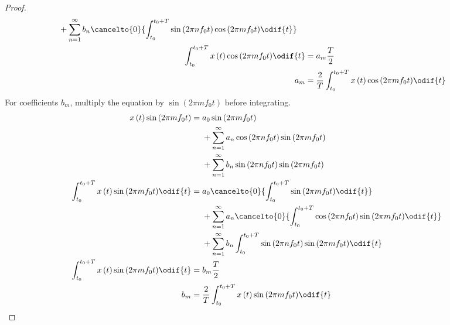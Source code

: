 \documentclass{article}
\begin{document}
\begin{proof}
\begin{align*}
\begin{aligned}[t]
             & + \sum_{n = 1}^\infty b_n \cancelto{0}{\int_{t_0}^{t_0 + T} \sin{\left( 2 \pi n f_0 t \right)} \cos{\left( 2 \pi m f_0 t \right)} \odif{t}}
        \end{aligned}
        \\
        \int_{t_0}^{t_0 + T} x\left( t \right) \cos{\left( 2 \pi m f_0 t \right)} \odif{t} & = a_m \frac{T}{2}                                                                                \\
        a_m                                                                                & = \frac{2}{T} \int_{t_0}^{t_0 + T} x\left( t \right) \cos{\left( 2 \pi m f_0 t \right)} \odif{t}
    \end{align*}
    For coefficients \(b_m\), multiply the equation by \(\sin{\left( 2
    \pi m f_0 t \right)}\) before integrating.
    \begin{align*}
        x\left( t \right) \sin{\left( 2 \pi m f_0 t \right)}                               & =
        \begin{aligned}[t]
             & a_0 \sin{\left( 2 \pi m f_0 t \right)}                                                          \\
             & + \sum_{n = 1}^\infty a_n \cos{\left( 2 \pi n f_0 t \right)} \sin{\left( 2 \pi m f_0 t \right)} \\
             & + \sum_{n = 1}^\infty b_n \sin{\left( 2 \pi n f_0 t \right)} \sin{\left( 2 \pi m f_0 t \right)}
        \end{aligned}
        \\
        \int_{t_0}^{t_0 + T} x\left( t \right) \sin{\left( 2 \pi m f_0 t \right)} \odif{t} & =
        \begin{aligned}[t]
             & a_0 \cancelto{0}{\int_{t_0}^{t_0 + T} \sin{\left( 2 \pi m f_0 t \right)} \odif{t}}                                                          \\
             & + \sum_{n = 1}^\infty a_n \cancelto{0}{\int_{t_0}^{t_0 + T} \cos{\left( 2 \pi n f_0 t \right)} \sin{\left( 2 \pi m f_0 t \right)} \odif{t}} \\
             & + \sum_{n = 1}^\infty b_n \int_{t_0}^{t_0 + T} \sin{\left( 2 \pi n f_0 t \right)} \sin{\left( 2 \pi m f_0 t \right)} \odif{t}
        \end{aligned}
        \\
        \int_{t_0}^{t_0 + T} x\left( t \right) \sin{\left( 2 \pi m f_0 t \right)} \odif{t} & = b_m \frac{T}{2}                                                                                \\
        b_m                                                                                & = \frac{2}{T} \int_{t_0}^{t_0 + T} x\left( t \right) \sin{\left( 2 \pi m f_0 t \right)} \odif{t}
    \end{align*}
\end{proof}
\end{document}
